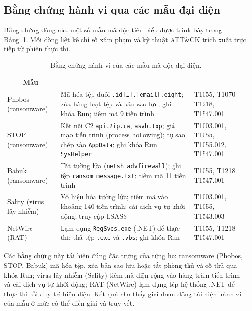 \documentclass[../DoAn.tex]{subfiles}
\begin{document}
\subsection{Bằng chứng hành vi qua các mẫu đại diện}
\label{section:5.3.2}

Bằng chứng động của một số mẫu mã độc tiêu biểu được trình bày trong
Bảng~\ref{tab:dyn-cases}. Mỗi dòng liệt kê chỉ số xâm phạm và kỹ thuật
ATT\&CK trích xuất trực tiếp từ phiên thực thi.
\begin{table}[H]
\centering
\caption{Bằng chứng hành vi của các mẫu mã độc đại diện.}
\label{tab:dyn-cases}
\begin{tabular}{|l|>{\raggedright\arraybackslash}p{7cm}|>{\raggedright\arraybackslash}p{3cm}|}
\hline
\multicolumn{1}{|c|}{\textbf{Mẫu}} & \multicolumn{1}{c|}{\textbf{Bằng chứng động}} & \multicolumn{1}{c|}{\textbf{ATT\&CK}} \\
\hline
Phobos (ransomware) &
  Mã hóa tệp đuôi \texttt{.id[\ldots].[email].eight}; xóa hàng loạt
  tệp và bản sao lưu; ghi khóa Run; tiêm mã 9 tiến trình &
  T1055, T1070, T1218, T1547.001 \\
\hline
STOP (ransomware) &
  Kết nối C2 \texttt{api.2ip.ua}, \texttt{asvb.top}; giả mạo tiến
  trình (process hollowing); tự sao chép vào \texttt{AppData}; ghi
  khóa Run \texttt{SysHelper} &
  T1003.001, T1055, T1055.012, T1547.001 \\
\hline
Babuk (ransomware) &
  Tắt tường lửa (\texttt{netsh advfirewall}); ghi tệp
  \texttt{ransom\_message.txt}; tiêm mã 11 tiến trình &
  T1055, T1218, T1547.001 \\
\hline
Sality (virus lây nhiễm) &
  Vô hiệu hóa tường lửa; tiêm mã vào khoảng 140 tiến trình; cài dịch
  vụ tự khởi động; truy cập LSASS &
  T1003.001, T1055, T1543.003 \\
\hline
NetWire (RAT) &
  Lạm dụng \texttt{RegSvcs.exe} (.NET) để thực thi; thả tệp
  \texttt{.exe} và \texttt{.vbs}; ghi khóa Run &
  T1055, T1218, T1547.001 \\
\hline
\end{tabular}
\end{table}
Các bằng chứng này tái hiện đúng đặc trưng của từng họ: ransomware
(Phobos, STOP, Babuk) mã hóa tệp, xóa bản sao lưu hoặc tắt phòng thủ
và cố thủ qua khóa Run; virus lây nhiễm (Sality) tiêm mã diện rộng vào
hàng trăm tiến trình và cài dịch vụ tự khởi động; RAT (NetWire) lạm
dụng tệp hệ thống .NET để thực thi rồi duy trì hiện diện. Kết quả cho
thấy giai đoạn động tái hiện hành vi của mẫu ở mức có thể diễn giải và
truy vết.
\end{document}
